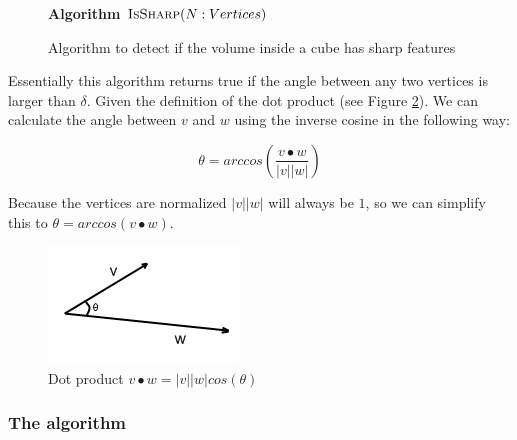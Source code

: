\documentclass[a4paper,10pt,twocolumn]{article}
\begin{document}
    \begin{figure}[ht]
            \textbf{Algorithm} $\textsc{IsSharp}(N: Vertices)$\\
            \noindent
            \begin{algorithm}[H]
                \;
                \BlankLine
                \;
            \end{algorithm}
        \caption{Algorithm to detect if the volume inside a cube has sharp features}
        \label{figure:algorithm}
    \end{figure}

Essentially this algorithm returns true if the angle between any two vertices is larger than $\delta$. Given the definition of the dot product (see Figure \ref{figure:dot_product}). We can calculate the angle between $v$ and $w$ using the inverse cosine in the following way:

\begin{equation}
    \theta = arccos(\displaystyle\frac{v \bullet w}{|v||w|})
\end{equation}

Because the vertices are normalized $|v||w|$ will always be $1$, so we can simplify this to $\theta = arccos(v \bullet w)$.

    \begin{figure}[h!]
        \begin{center}
            \includegraphics[scale=0.8]{./images/dotproduct}
        \end{center}
        \caption{Dot product $v \bullet w = |v||w|cos(\theta)$}
        \label{figure:dot_product}
    \end{figure}


\subsubsection{The algorithm}
\end{document}
